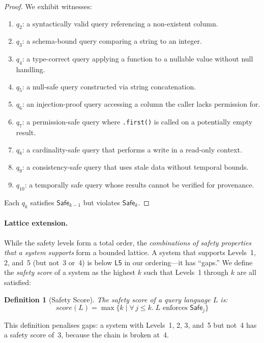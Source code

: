\documentclass[11pt,a4paper]{article}
\newtheorem{definition}[theorem]{Definition}
\newcommand{\LevelN}[1]{\textsf{L#1}}
\newcommand{\Safe}[1]{\ensuremath{\mathsf{Safe}_{#1}}}
\begin{document}
\begin{proof}
We exhibit witnesses:
\begin{enumerate}[nosep,label=(\arabic*)]
  \item $q_2$: a syntactically valid query referencing a non-existent column.
  \item $q_3$: a schema-bound query comparing a string to an integer.
  \item $q_4$: a type-correct query applying a function to a nullable
    value without null handling.
  \item $q_5$: a null-safe query constructed via string concatenation.
  \item $q_6$: an injection-proof query accessing a column the caller lacks permission for.
  \item $q_7$: a permission-safe query where \texttt{.first()} is
    called on a potentially empty result.
  \item $q_8$: a cardinality-safe query that performs a write in a
    read-only context.
  \item $q_9$: a consistency-safe query that uses stale data without
    temporal bounds.
  \item $q_{10}$: a temporally safe query whose results cannot be
    verified for provenance.
\end{enumerate}
Each $q_k$ satisfies $\Safe{k-1}$ but violates $\Safe{k}$.
\end{proof}

\paragraph{Lattice extension.}
While the safety levels form a total order, the \emph{combinations of
safety properties that a system supports} form a bounded lattice.  A
system that supports Levels~1, 2, and~5 (but not~3 or~4) is below
$\LevelN{5}$ in our ordering---it has ``gaps.''  We define the
\emph{safety score} of a system as the highest $k$ such that Levels~1
through $k$ are all satisfied:

\begin{definition}[Safety Score]
The \emph{safety score} of a query language $L$ is:
\[
  \mathit{score}(L) = \max\{k \mid \forall\, j \leq k.\; L \text{ enforces } \Safe{j}\}
\]
\end{definition}

This definition penalises gaps: a system with Levels~1, 2, 3, and~5
but not~4 has a safety score of~3, because the chain is broken at~4.
\end{document}
